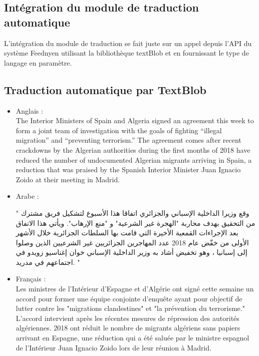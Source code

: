 \subsection{Intégration du module de traduction automatique}
L'intégration du module de traduction se fait juste sur un appel depuis l'API du système \textquotedbl Feedny\textquotedbl en utilisant la bibliothèque textBlob et en fournissant le type de langage en paramètre.

\subsection{Traduction automatique par TextBlob}
\begin{itemize}
    \item Anglais :\\ 
    \textquotedbl The Interior Ministers of Spain and Algeria signed an agreement this week to form a joint team of investigation with the goals of fighting “illegal migration” and “preventing terrorism.” The agreement comes after recent crackdowns by the Algerian authorities during the first months of 2018 have reduced the number of undocumented Algerian migrants arriving in Spain, a reduction that was praised by the Spanish Interior Minister Juan Ignacio Zoido at their meeting in Madrid.\textquotedbl \\
    
    \item Arabe :\\
    \begin{arab}" وقع وزيرا الداخلية الإسباني والجزائري اتفاقا هذا الأسبوع لتشكيل فريق مشترك من التحقيق بهدف محاربة "الهجرة غير الشرعية" و "منع الإرهاب". ويأتي هذا الاتفاق بعد الإجراءات القمعية الأخيرة التي قامت بها السلطات الجزائرية خلال الأشهر الأولى من خفّض عام 2018 عدد المهاجرين الجزائريين غير الشرعيين الذين وصلوا إلى إسبانيا ، وهو تخفيض أشاد به وزير الداخلية الإسباني خوان إغناسيو زويدو في اجتماعهم في مدريد. "\end{arab}
    
    \item Français :\\
    \textquotedbl Les ministres de l'Intérieur d'Espagne et d'Algérie ont signé cette semaine un accord pour former une équipe conjointe d'enquête ayant pour objectif de lutter contre les "migrations clandestines" et "la prévention du terrorisme." L'accord intervient après les récentes mesures de répression des autorités algériennes. 2018 ont réduit le nombre de migrants algériens sans papiers arrivant en Espagne, une réduction qui a été saluée par le ministre espagnol de l'Intérieur Juan Ignacio Zoido lors de leur réunion à Madrid.\textquotedbl \\
\end{itemize}

